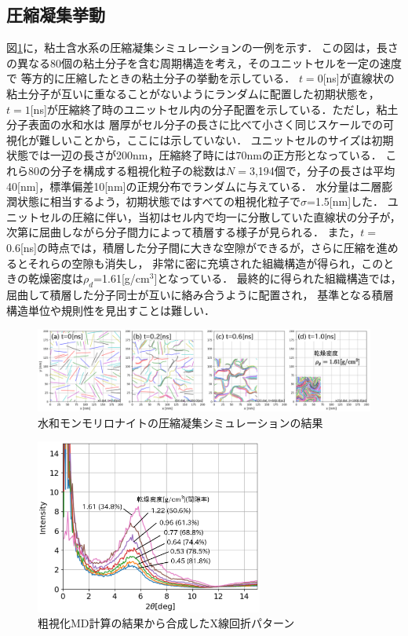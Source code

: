 ﻿\documentclass[11pt,a4j]{jarticle}
\begin{document}
\subsection{圧縮凝集挙動}
図\ref{fig:fig2}に，粘土含水系の圧縮凝集シミュレーションの一例を示す．
この図は，長さの異なる80個の粘土分子を含む周期構造を考え，そのユニットセルを一定の速度で
等方的に圧縮したときの粘土分子の挙動を示している．
$t=0$[ns]が直線状の粘土分子が互いに重なることがないようにランダムに配置した初期状態を，
$t=1$[ns]が圧縮終了時のユニットセル内の分子配置を示している．ただし，粘土分子表面の水和水は
層厚がセル分子の長さに比べて小さく同じスケールでの可視化が難しいことから，ここには示していない．
ユニットセルのサイズは初期状態では一辺の長さが200nm，圧縮終了時には70nmの正方形となっている．
これら80の分子を構成する粗視化粒子の総数は$N=$3,194個で，分子の長さは平均40[nm]，標準偏差10[nm]の正規分布でランダムに与えている．
水分量は二層膨潤状態に相当するよう，初期状態ではすべての粗視化粒子で$\sigma$=1.5[nm]した．
ユニットセルの圧縮に伴い，当初はセル内で均一に分散していた直線状の分子が，次第に屈曲しながら分子間力によって積層する様子が見られる．
また，$t=$0.6[ns]の時点では，積層した分子間に大きな空隙ができるが，さらに圧縮を進めるとそれらの空隙も消失し，
非常に密に充填された組織構造が得られ，このときの乾燥密度は$\rho_d$=1.61[g/cm$^3$]となっている．
最終的に得られた組織構造では，屈曲して積層した分子同士が互いに絡み合うように配置され，
基準となる積層構造単位や規則性を見出すことは難しい．
\begin{figure}[t]
	\begin{center}
	\includegraphics[width=1.0\linewidth]{Figs/revs.eps} 
	\end{center}
	\caption{水和モンモリロナイトの圧縮凝集シミュレーションの結果} 
	\label{fig:fig2}
\end{figure}
\begin{figure}
	\centering
	\includegraphics[keepaspectratio,width=75mm]{Figs/xrd.eps}
	\vspace{-5mm}
	\caption{粗視化MD計算の結果から合成したX線回折パターン}
	\label{fig:fig3}
\end{figure}
\end{document}
